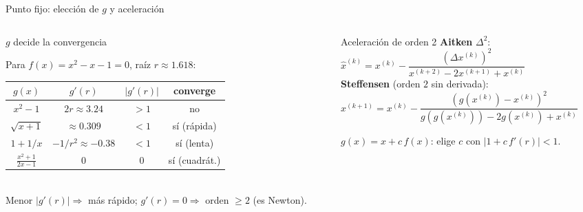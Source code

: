 \documentclass[aspectratio=169,10pt]{beamer}
\begin{document}
\begin{frame}{Punto fijo: elección de $g$ y aceleración}
\begin{columns}[T]
\begin{column}{0.56\textwidth}
\begin{cardgear}{$g$ decide la convergencia}{\faTable}
\centering
{\footnotesize Para $f(x)=x^2-x-1=0$, raíz $r\approx1.618$:\\[1mm]
\renewcommand{\arraystretch}{1.25}\setlength{\tabcolsep}{4pt}
\begin{tabular}{c|ccc}
$g(x)$ & $g'(r)$ & $|g'(r)|$ & converge\\\hline
$x^2-1$ & $2r\approx3.24$ & $>1$ & no\\
$\sqrt{x+1}$ & $\approx0.309$ & $<1$ & sí (rápida)\\
$1+1/x$ & $-1/r^2\approx-0.38$ & $<1$ & sí (lenta)\\
$\tfrac{x^2+1}{2x-1}$ & $0$ & $0$ & sí (cuadrát.)\\
\end{tabular}}\\[1mm]
{\footnotesize Menor $|g'(r)|\Rightarrow$ más rápido; $g'(r)=0\Rightarrow$ orden $\ge2$ (es Newton).}
\end{cardgear}
\end{column}
\begin{column}{0.42\textwidth}
\begin{cardidea}{Aceleración de orden 2}{\faSuperscript}
{\footnotesize \textbf{Aitken} $\Delta^2$:\\[0.4mm]
$\hat x^{(k)}=x^{(k)}-\dfrac{(\Delta x^{(k)})^2}{x^{(k+2)}-2x^{(k+1)}+x^{(k)}}$\\[1.6mm]
\textbf{Steffensen} (orden $2$ sin derivada):\\[0.4mm]
$x^{(k+1)}=x^{(k)}-\dfrac{(g(x^{(k)})-x^{(k)})^2}{g(g(x^{(k)}))-2g(x^{(k)})+x^{(k)}}$}
\end{cardidea}
\vspace{1mm}
\begin{cardnota}[\faInfoCircle]{\footnotesize $g(x)=x+c\,f(x)$: elige $c$ con $|1+c\,f'(r)|<1$.}\end{cardnota}
\end{column}
\end{columns}
\end{frame}
\end{document}

